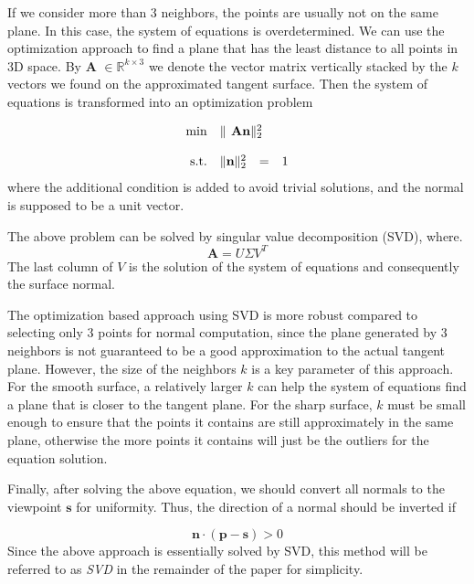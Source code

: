 If we consider more than 3 neighbors, the points are usually not on the same plane. In this case, the system of equations is overdetermined. We can use the optimization approach to find a plane that has the least distance to all points in 3D space. By $ \textbf{A }\in \mathbb{R}^{k\times 3} $ we denote the vector matrix vertically stacked by the $ k $ vectors we found on the approximated tangent surface. Then the system of equations is transformed into an optimization problem 



\begin{equation}
	\begin{array}{rrclcl}
		\displaystyle \min & \multicolumn{3}{l}{\|\textbf{ A}  \bn \|^2_2} \\
		\\
		\textrm{s.t.} & \| \bn \|^2_2 & = & 1 
	\end{array}
\end{equation}
where the additional condition is added to avoid trivial solutions, and the normal is supposed to be a unit vector.

The above problem can be solved by singular value decomposition (SVD), where.
\[ \textbf{A}=U\Sigma V^T \]
The last column of $ V $ is the solution of the system of equations and consequently the surface normal. 

The optimization based approach using SVD is more robust compared to selecting only 3 points for normal computation, since the plane generated by 3 neighbors is not guaranteed to be a good approximation to the actual tangent plane. However, the size of the neighbors $ k $ is a key parameter of this approach. For the smooth surface, a relatively larger $ k $ can help the system of equations find a plane that is closer to the tangent plane. For the sharp surface, $ k $ must be small enough to ensure that the points it contains are still approximately in the same plane, otherwise the more points it contains will just be the outliers for the equation solution. 

Finally, after solving the above equation, we should convert all normals to the viewpoint $ \textbf{s} $ for uniformity. Thus, the direction of a normal should be inverted if 


\begin{equation}\label{eq:normal-invertion}
	\textbf{n} \cdot (\textbf{p}  - \textbf{s}) > 0
\end{equation}
Since the above approach is essentially solved by SVD, this method will be referred to as \textit{SVD} in the remainder of the paper for simplicity.

